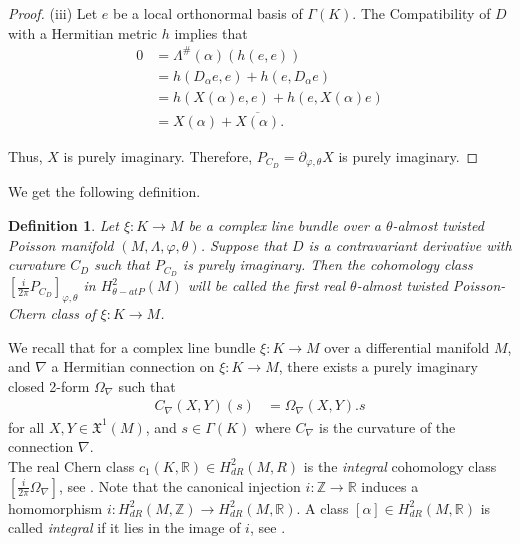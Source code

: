 \documentclass[a4paper,10pt]{article}
\numberwithin{equation}{section}
\theoremstyle{plain}
\newtheorem{definition}[theorem]{Definition}
\newcommand{\CD}{C_D}
\newcommand{\PCD}{P_{\CD}}
\begin{document}
\begin{proof}
		\noindent(iii) Let \(e\) be a local orthonormal basis of $\Gamma (K)$. The  Compatibility of $D$ with a Hermitian metric
		$h$ implies that
		\begin{align*}
		0 &= \Lambda^\#(\alpha)(h(e,e))\\
		&= h(D_\alpha e, e) + h(e, D_\alpha e)\\
		& = h(X(\alpha)e,e) + h(e,X(\alpha)e)\\
		&=X(\alpha)+ \overline{X(\alpha)}.
		\end{align*}
		
		Thus, \(X\) is purely imaginary.  Therefore, \(\PCD = \partial_{\varphi,\theta} X\) is purely imaginary.
	\end{proof}
	We get the following definition.
	\begin{definition}
		Let $\xi: K\to M$ be   a complex line bundle over a $\theta$-almost twisted Poisson manifold $(M,\Lambda,\varphi,\theta)$. Suppose that  $D$  is  a contravariant derivative with curvature $C_D$ such that $P_{C_D}$ is purely imaginary. Then the cohomology class   $[\frac{i}{2\pi}P_{C_D}]_{\varphi,\theta}$ in $H_{\theta-atP}^{2}(M)$ will be called  \textit{the first real $\theta$-almost twisted Poisson-Chern class} of  $\xi: K\to M$.
	\end{definition}
	
	We recall that for   a complex line bundle  $\xi: K\to M$ over a   differential manifold $M$, and  $\nabla$  a Hermitian connection  on  $\xi: K\to M$, there exists a purely imaginary closed 2-form $\Omega_\nabla$ such that
	\begin{align}
	C_\nabla(X,Y)(s)&=\Omega_\nabla(X,Y).s
	\end{align}
	for all $X,Y\in \mathfrak{X}^1(M)$, and $s\in \Gamma (K)$  where $C_\nabla$ is the curvature of the connection $\nabla$. \\ The real Chern class  $c_1(K,\mathbb{R})\in H_{dR}^2(M,R)$ is the \textit{integral} cohomology class $[\frac{i}{2\pi}\Omega_\nabla]$, see \cite{R22}.
	Note that the canonical
	injection $i : \mathbb{Z}\to\mathbb{R}$ induces a homomorphism $i: H_{dR}^2(M,\mathbb{Z})\longrightarrow H_{dR}^2(M,\mathbb{R})$. A class $[\alpha]\in H_{dR}^2(M,\mathbb{R})$  is called \textit{integral} if  it lies in the image  of $i$, see \cite{R22}.
	
\end{document}
